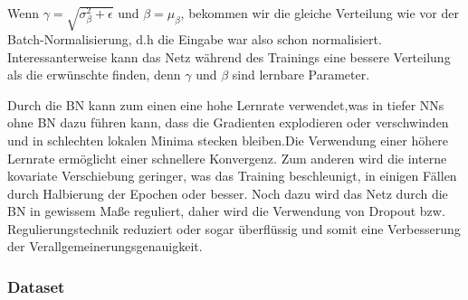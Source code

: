 \documentclass[12pt,a4paper]{scrartcl}
\numberwithin{equation}{section}
\begin{document}
Wenn $\gamma = \sqrt{\sigma_\beta^2 + \epsilon}$ und $\beta = \mu_\beta $, bekommen wir die gleiche Verteilung wie vor der Batch-Normalisierung, d.h die Eingabe war also schon normalisiert. Interessanterweise kann das Netz während des Trainings eine bessere Verteilung als die erwünschte finden, denn $\gamma$ und $\beta$ sind lernbare Parameter.

Durch die BN kann zum einen eine hohe Lernrate verwendet,was in tiefer \acsp{NN} ohne BN dazu führen kann, dass die Gradienten explodieren oder verschwinden und in schlechten lokalen Minima stecken bleiben.Die Verwendung einer höhere Lernrate ermöglicht einer schnellere Konvergenz.
Zum anderen wird die interne kovariate Verschiebung geringer, was das Training beschleunigt, in einigen Fällen durch Halbierung der Epochen oder besser. Noch dazu wird das Netz durch die BN in gewissem Maße reguliert, daher wird die Verwendung von Dropout bzw. Regulierungstechnik reduziert oder sogar überflüssig und somit eine Verbesserung der Verallgemeinerungsgenauigkeit.
\subsubsection{Dataset}



\end{document}
